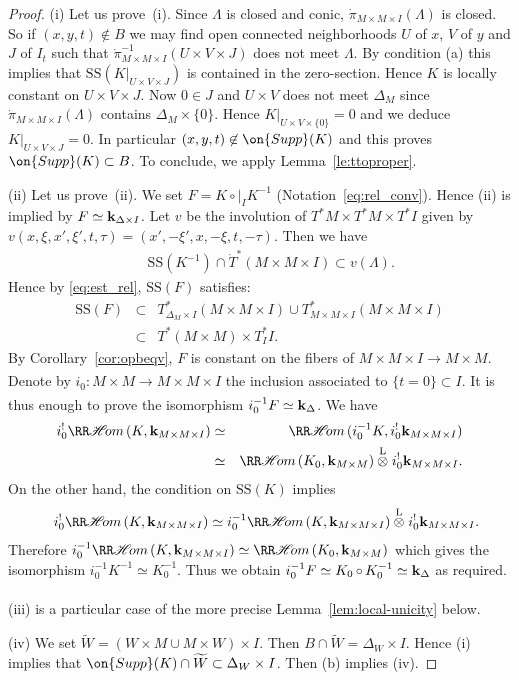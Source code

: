 \documentclass[12pt,leqno]{article}
\theoremstyle{definition}
\newcommand{\cor}{{\bf k}}
\renewcommand{\to}[1][]{\xrightarrow[]{#1}}
\newcommand{\rhom}[1][]{{\RR\mathscr{H}\mspace{-3mu}om}_{\raise1.5ex\hbox to.1em{}#1}}
\newcommand{\ltens}[1][]{\mathbin{\overset{\mathrm{L}}\otimes}_{#1}}
\newcommand{\conv}[1][]{\mathop{\circ}\limits_{#1}}
\newcommand{\opb}[1]{#1^{-1}}
\newcommand{\epb}[1]{#1^{!}}
\newcommand{\cl}{\colon}
\newcommand{\tw}[1]{\widetilde{#1}}
\newcommand{\eq}{\begin{eqnarray}}
\newcommand{\eneq}{\end{eqnarray}}
\newcommand{\eqn}{\begin{eqnarray*}}
\newcommand{\eneqn}{\end{eqnarray*}}
\newcommand{\Supp}{\on{Supp}}
\newcommand{\SSi}{\mathrm{SS}}
\newcommand{\dT}{{\dot{T}}}
\numberwithin{equation}{section}
\begin{document}
\begin{proof}
(i) Let us prove~(i).  Since $\Lambda$ is closed and conic,
$\dot\pi_{M\times M\times I}(\Lambda)$ is closed.  So if $(x,y,t) \not\in B$
we may find open connected neighborhoods $U$ of $x$, 
$V$ of $y$ and $J$ of $I_t$ such that
$\opb{\dot\pi_{M\times M\times I}}(U\times V\times J)$ does not meet $\Lambda$.
By condition (a) this implies that $\SSi(K|_{U\times V\times J})$ is contained
in the zero-section. Hence $K$ is locally constant on $U\times V\times J$.
Now $0\in J$ and $U\times V$ does not meet $\Delta_M$ since
$\dot\pi_{M\times M\times I}(\Lambda)$ contains $\Delta_M \times \{0\}$.
Hence $K|_{U\times V\times \{0\}} = 0$ and we deduce 
$K|_{U\times V\times J} = 0$. In particular $(x,y,t) \not\in \Supp(K)$ and
this proves $\Supp(K) \subset B$. To conclude, we apply
Lemma~\ref{le:ttoproper}.

\bigskip\noindent
(ii) Let us prove~(ii). We set $F=K\conv|_I \opb{K}$
(Notation~\eqref{eq:rel_conv}). 
Hence (ii) is implied by
$F\simeq \cor_{\Delta\times I}$. 
Let $v$ be the involution of
$T^*M\times T^*M\times T^*I$
given by $v(x,\xi,x',\xi',t,\tau) = (x',-\xi',x,-\xi,t,-\tau)$.
Then we have
\eq\label{est:dual}
&&\SSi(\opb{K})\cap\dT^*(M\times M\times I)\subset v(\Lambda).
\eneq
Hence by \eqref{eq:est_rel},
$\SSi(F)$ satisfies:
\eqn
\SSi(F)&\subset&
T^*_{\Delta_M\times I}(M\times M\times I)
                 \cup T^*_{M\times M\times I}(M\times M\times I)\\
&\subset&T^*(M\times M)\times T^*_II.
\eneqn
By Corollary~\ref{cor:opbeqv}, $F$ is constant on the fibers of 
$M\times M\times I\to M\times M$.
Denote by $i_0\cl M\times M\to M\times M\times I$
the inclusion associated to $\{t=0\}\subset I$.
It is thus enough to prove the isomorphism 
$\opb{i_0}F\simeq \cor_{\Delta}$. We have
\eqn
\epb{i_0}\rhom(K,\cor_{M\times M\times I})
&\simeq&\rhom(\opb{i_0}K,\epb{i_0}\cor_{M\times M\times I})\\
&\simeq&\rhom(K_0,\cor_{M\times M})\ltens \epb{i_0}\cor_{M\times M\times I}.
\eneqn
On the other hand, the  condition on $\SSi(K)$ implies
\eqn
&&\epb{i_0}\rhom(K,\cor_{M\times M\times I})
\simeq \opb{i_0}\rhom(K,\cor_{M\times M\times I})
\ltens \epb{i_0}\cor_{M\times M\times I}.
\eneqn
Therefore
$\opb{i_0}\rhom(K,\cor_{M\times M\times I})\simeq\rhom(K_0,\cor_{M\times M})$
which gives the isomorphism $\opb{i_0}\opb{K}\simeq \opb{K_0}$.
Thus we obtain
$\opb{i_0}F\simeq K_0\conv \opb{K_0}\simeq\cor_{\Delta}$
as required.


\bigskip\noindent
(iii) is a particular case of the more precise
Lemma~\ref{lem:local-unicity} below.

\bigskip\noindent
(iv) 
We set $\tw W= (W\times M \cup M\times W)\times I$. 
Then $B\cap \tw W=\Delta_W\times I$.
Hence (i) implies that $\Supp(K)\cap \tw W\subset\Delta_W\times I$.
Then (b) implies (iv).
\end{proof}
\end{document}
